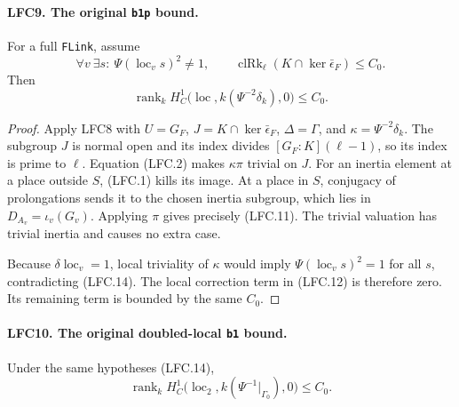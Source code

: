 \documentclass[11pt,a4paper]{article}
\numberwithin{equation}{section}
\theoremstyle{remark}\newtheorem{remark}[theorem]{Remark}
\begin{document}
\paragraph{LFC9. The original \texttt{b1p} bound.}
\label{claim:LFC9}
For a full \texttt{FLink}, assume
\[
 \forall v\ \exists s:\ \Psi(\operatorname{loc}_v s)^2\ne1,
 \qquad
 \operatorname{clRk}_\ell
       (K\cap\ker\bar\epsilon_F)\le C_0.                 \tag{LFC.14}
\]
Then
\[
 \operatorname{rank}_k
 H^1_C\bigl(\operatorname{loc},
               k(\Psi^{-2}\delta_k),0\bigr)\le C_0.
                                                        \tag{LFC.15}
\]

\begin{proof}
Apply LFC8 with \(U=G_F\),
\(J=K\cap\ker\bar\epsilon_F\), \(\Delta=\Gamma\), and
\(\kappa=\Psi^{-2}\delta_k\).
The subgroup \(J\) is normal open and its index divides
\([G_F:K](\ell-1)\), so its index is prime to \(\ell\).
Equation (LFC.2) makes \(\kappa\pi\) trivial on \(J\).
For an inertia element at a place outside \(S\), (LFC.1)
kills its image.  At a place in \(S\), conjugacy of
prolongations sends it to the chosen inertia subgroup,
which lies in \(D_{A_v}=\iota_v(G_v)\).  Applying \(\pi\)
gives precisely (LFC.11).
The trivial valuation has trivial inertia and causes
no extra case.

Because \(\delta\operatorname{loc}_v=1\), local triviality
of \(\kappa\) would imply
\(\Psi(\operatorname{loc}_v s)^2=1\) for all \(s\),
contradicting (LFC.14).
The local correction term in (LFC.12) is therefore zero.
Its remaining term is bounded by the same \(C_0\).
\end{proof}

\paragraph{LFC10. The original doubled-local \texttt{b1} bound.}
\label{claim:LFC10}
Under the same hypotheses (LFC.14),
\[
 \operatorname{rank}_k H^1_C
   \bigl(\operatorname{loc}_2,
         k(\Psi^{-1}|_{\Gamma_0}),0\bigr)\le C_0.
                                                        \tag{LFC.16}
\]
\end{document}
